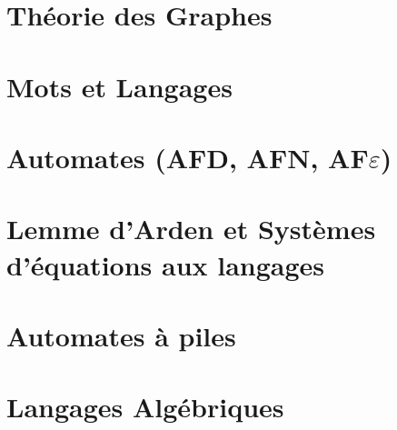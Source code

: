 



\chapter{Théorie des Graphes}


\chapter{Mots et Langages}


\chapter{Automates (AFD, AFN, AF$\varepsilon$)}


\chapter{Lemme d'Arden et Systèmes d'équations aux langages}


\chapter{Automates à piles}


\chapter{Langages Algébriques}





